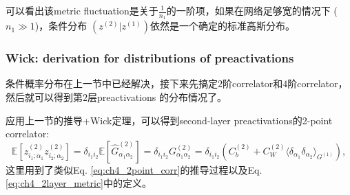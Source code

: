 可以看出该metric fluctuation是关于$\frac{1}{n_1}$的一阶项，如果在网络足够宽的情况下 ($n_1 \gg 1$)，条件分布
$(z^{(2)}\big| z^{(1)})$依然是一个确定的标准高斯分布。

\subsubsection{Wick: derivation for distributions of preactivations}
条件概率分布在上一节中已经解决，接下来先搞定$2$阶correlator和$4$阶correlator，然后就可以得到第$2$层preactivations
的分布情况了。

应用上一节的推导+Wick定理，可以得到second-layer preactivations的2-point correlator:
\begin{equation}
    \mathbb{E}\left[z_{i_1;\alpha_1}^{(2)}z_{i_2;\alpha_2}^{(2)}\right]
    = \delta_{i_1i_2}\mathbb{E}\left[\hat{G}_{\alpha_1\alpha_2}^{(2)}\right]
    = \delta_{i_1i_2}G_{\alpha_1\alpha_2}^{(2)}
    = \delta_{i_1i_2}\left(C_b^{(2)} + C_W^{(2)}\langle\delta_{\alpha_1}\delta_{\alpha_2}
    \rangle_{G^{(1)}}\right),
\end{equation}
这里用到了类似Eq. \ref{eq:ch4_2point_corr}的推导过程以及Eq. \ref{eq:ch4_2layer_metric}中的定义。

